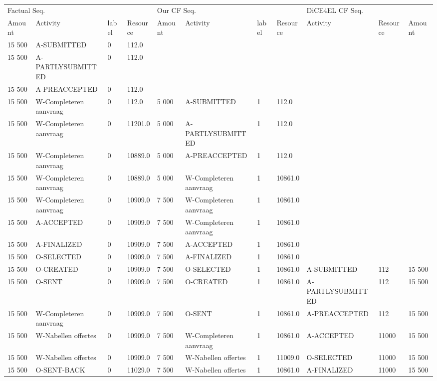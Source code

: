\begin{tabular}{lllllllllll}
\toprule
\multicolumn{4}{l}{Factual Seq.} & \multicolumn{4}{l}{Our CF Seq.} & \multicolumn{3}{l}{DiCE4EL CF Seq.} \\
Amount & Activity & label & Resource & Amount & Activity & label & Resource & Activity & Resource & Amount \\
\midrule
15 500 & A-SUBMITTED & 0 & 112.0 &  &  &  &  &  &  &  \\
15 500 & A-PARTLYSUBMITTED & 0 & 112.0 &  &  &  &  &  &  &  \\
15 500 & A-PREACCEPTED & 0 & 112.0 &  &  &  &  &  &  &  \\
15 500 & W-Completeren aanvraag & 0 & 112.0 & 5 000 & A-SUBMITTED & 1 & 112.0 &  &  &  \\
15 500 & W-Completeren aanvraag & 0 & 11201.0 & 5 000 & A-PARTLYSUBMITTED & 1 & 112.0 &  &  &  \\
15 500 & W-Completeren aanvraag & 0 & 10889.0 & 5 000 & A-PREACCEPTED & 1 & 112.0 &  &  &  \\
15 500 & W-Completeren aanvraag & 0 & 10889.0 & 5 000 & W-Completeren aanvraag & 1 & 10861.0 &  &  &  \\
15 500 & W-Completeren aanvraag & 0 & 10909.0 & 7 500 & W-Completeren aanvraag & 1 & 10861.0 &  &  &  \\
15 500 & A-ACCEPTED & 0 & 10909.0 & 7 500 & W-Completeren aanvraag & 1 & 10861.0 &  &  &  \\
15 500 & A-FINALIZED & 0 & 10909.0 & 7 500 & A-ACCEPTED & 1 & 10861.0 &  &  &  \\
15 500 & O-SELECTED & 0 & 10909.0 & 7 500 & A-FINALIZED & 1 & 10861.0 &  &  &  \\
15 500 & O-CREATED & 0 & 10909.0 & 7 500 & O-SELECTED & 1 & 10861.0 & A-SUBMITTED & 112 & 15 500 \\
15 500 & O-SENT & 0 & 10909.0 & 7 500 & O-CREATED & 1 & 10861.0 & A-PARTLYSUBMITTED & 112 & 15 500 \\
15 500 & W-Completeren aanvraag & 0 & 10909.0 & 7 500 & O-SENT & 1 & 10861.0 & A-PREACCEPTED & 112 & 15 500 \\
15 500 & W-Nabellen offertes & 0 & 10909.0 & 7 500 & W-Completeren aanvraag & 1 & 10861.0 & A-ACCEPTED & 11000 & 15 500 \\
15 500 & W-Nabellen offertes & 0 & 10909.0 & 7 500 & W-Nabellen offertes & 1 & 11009.0 & O-SELECTED & 11000 & 15 500 \\
15 500 & O-SENT-BACK & 0 & 11029.0 & 7 500 & W-Nabellen offertes & 1 & 10861.0 & A-FINALIZED & 11000 & 15 500 \\

\end{tabular}
